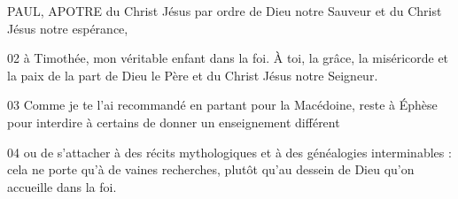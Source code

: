 PAUL, APOTRE du Christ Jésus par ordre de Dieu notre Sauveur et du Christ Jésus notre espérance,

02 à Timothée, mon véritable enfant dans la foi. À toi, la grâce, la miséricorde et la paix de la part de Dieu le Père et du Christ Jésus notre Seigneur.

03 Comme je te l’ai recommandé en partant pour la Macédoine, reste à Éphèse pour interdire à certains de donner un enseignement différent

04 ou de s’attacher à des récits mythologiques et à des généalogies interminables : cela ne porte qu’à de vaines recherches, plutôt qu’au dessein de Dieu qu’on accueille dans la foi.
